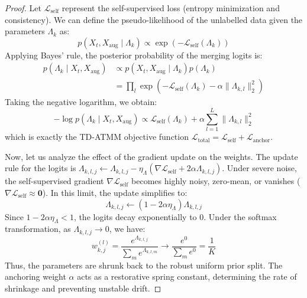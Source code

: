\documentclass{article}
\theoremstyle{plain}
\theoremstyle{definition}
\theoremstyle{remark}
\begin{document}
\begin{proof}
Let $\mathcal{L}_{\text{self}}$ represent the self-supervised loss (entropy minimization and consistency). We can define the pseudo-likelihood of the unlabelled data given the parameters $\Lambda_k$ as:
\begin{equation}
p(X_t, X_{\text{aug}} \mid \Lambda_k) \propto \exp\left(-\mathcal{L}_{\text{self}}(\Lambda_k)\right)
\end{equation}
Applying Bayes' rule, the posterior probability of the merging logits is:
\begin{align}
p(\Lambda_k \mid X_t, X_{\text{aug}}) &\propto p(X_t, X_{\text{aug}} \mid \Lambda_k) p(\Lambda_k) \\
&= \prod_{l} \exp\left(-\mathcal{L}_{\text{self}}(\Lambda_k) - \alpha \|\Lambda_{k, l}\|_2^2\right)
\end{align}
Taking the negative logarithm, we obtain:
\begin{equation}
-\log p(\Lambda_k \mid X_t, X_{\text{aug}}) \propto \mathcal{L}_{\text{self}}(\Lambda_k) + \alpha \sum_{l=1}^L \|\Lambda_{k, l}\|_2^2
\end{equation}
which is exactly the TD-ATMM objective function $\mathcal{L}_{\text{total}} = \mathcal{L}_{\text{self}} + \mathcal{L}_{\text{anchor}}$. 

Now, let us analyze the effect of the gradient update on the weights. The update rule for the logits is $\Lambda_{k, l, j} \leftarrow \Lambda_{k, l, j} - \eta_{\Lambda} \left(\nabla \mathcal{L}_{\text{self}} + 2 \alpha \Lambda_{k, l, j}\right)$. Under severe noise, the self-supervised gradient $\nabla \mathcal{L}_{\text{self}}$ becomes highly noisy, zero-mean, or vanishes ($\nabla \mathcal{L}_{\text{self}} \approx \mathbf{0}$). In this limit, the update simplifies to:
\begin{equation}
\Lambda_{k, l, j} \leftarrow \left(1 - 2 \alpha \eta_{\Lambda}\right) \Lambda_{k, l, j}
\end{equation}
Since $1 - 2 \alpha \eta_{\Lambda} < 1$, the logits decay exponentially to $0$. Under the softmax transformation, as $\Lambda_{k, l, j} \to 0$, we have:
\begin{equation}
w_{k, j}^{(l)} = \frac{e^{\Lambda_{k, l, j}}}{\sum_m e^{\Lambda_{k, l, m}}} \to \frac{e^0}{\sum_m e^0} = \frac{1}{K}
\end{equation}
Thus, the parameters are shrunk back to the robust uniform prior split. The anchoring weight $\alpha$ acts as a restorative spring constant, determining the rate of shrinkage and preventing unstable drift.
\end{proof}
\end{document}

